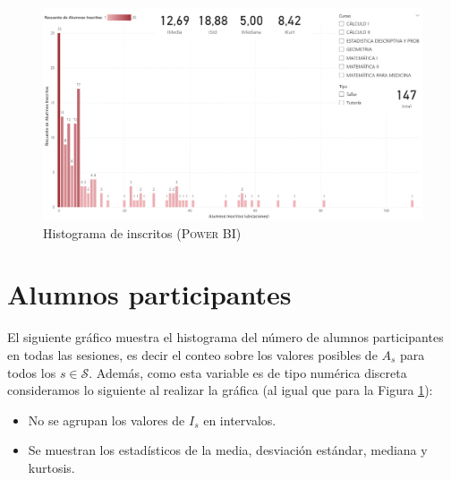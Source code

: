 \documentclass[11pt,a4paper]{book}
\theoremstyle{definition}%
\begin{document}
                \begin{figure}[H]
                    \centering
                    \includegraphics[width=1\textwidth]{Sources/histograma_InscritosGlobal.png}
                    \caption{Histograma de inscritos (\textsc{Power BI})}
                    \label{fig:histograma_InscritosGlobal}
                \end{figure}
            
            \newpage
            \section{Alumnos participantes}
                El siguiente gráfico muestra el histograma del número de alumnos participantes en todas las sesiones, es decir el conteo sobre los valores posibles de $A_s$ para todos los $s\in\mathcal{S}$. Además, como esta variable es de tipo numérica discreta consideramos lo siguiente al realizar la gráfica (al igual que para la Figura \ref{fig:histograma_InscritosGlobal}):
                \begin{itemize}
                    \item No se agrupan los valores de $I_s$ en intervalos.
                    \item Se muestran los estadísticos de la media, desviación estándar, mediana y kurtosis.
                \end{itemize}
                
\end{document}
